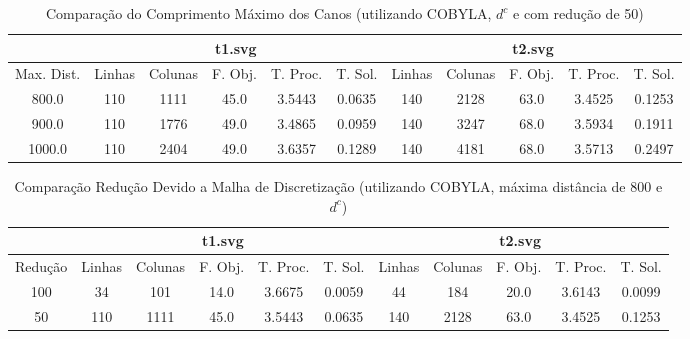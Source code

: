 \begin{landscape}
\begin{table}
    \centering
    \caption{Comparação do Comprimento Máximo dos Canos (utilizando COBYLA,
    $d^c$ e com redução de 50)}
    \label{tab:maxd}
    \begin{tabular}{|c|c|c|c|c|c|c|c|c|c|c|}
        \hline
        & \multicolumn{5}{|c|}{t1.svg} & \multicolumn{5}{|c|}{t2.svg} \\ \hline
        Max. Dist. & Linhas & Colunas & F. Obj. & T. Proc. & T. Sol. & Linhas &
        Colunas & F. Obj. & T. Proc. & T. Sol. \\ \hline
        800.0 & 110 & 1111 & 45.0 & 3.5443 & 0.0635 & 140 & 2128 & 63.0 & 3.4525 & 0.1253 \\ \hline
        900.0 & 110 & 1776 & 49.0 & 3.4865 & 0.0959 & 140 & 3247 & 68.0 & 3.5934 & 0.1911 \\ \hline
        1000.0 & 110 & 2404 & 49.0 & 3.6357 & 0.1289 & 140 & 4181 & 68.0 & 3.5713 & 0.2497 \\ \hline
    \end{tabular}
\end{table}

\begin{table}
    \centering
    \caption{Comparação Redução Devido a Malha de Discretização (utilizando COBYLA, máxima
    distância de 800 e $d^c$)}
    \label{tab:reduce}
    \begin{tabular}{|c|c|c|c|c|c|c|c|c|c|c|}
        \hline
        & \multicolumn{5}{|c|}{t1.svg} & \multicolumn{5}{|c|}{t2.svg} \\ \hline
        Redução & Linhas & Colunas & F. Obj. & T. Proc. & T. Sol. & Linhas &
        Colunas & F. Obj. & T. Proc. & T. Sol. \\ \hline
        100 & 34 & 101 & 14.0 & 3.6675 & 0.0059 & 44 & 184 & 20.0 & 3.6143 & 0.0099 \\ \hline
        50 & 110 & 1111 & 45.0 & 3.5443 & 0.0635 & 140 & 2128 & 63.0 & 3.4525 & 0.1253 \\ \hline
    \end{tabular}
\end{table}
\end{landscape}

